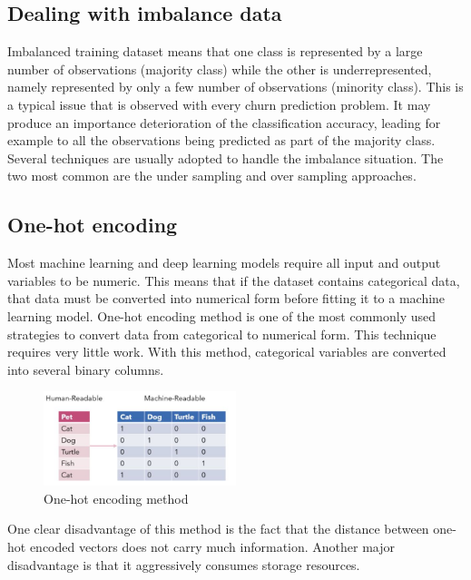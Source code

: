 \documentclass[LaM,binding=0.6cm, english]{sapthesis}
\begin{document}
\subsection{Dealing with imbalance data} \label{imbalance_data}

Imbalanced training dataset means that one class is represented by a large number of observations (majority class) while the other is underrepresented, namely represented by only a few number of observations (minority class). This is a typical issue that is observed with every churn prediction problem. It may produce an importance deterioration of the classification accuracy, leading for example to all the observations being predicted as part of the majority class. Several techniques are usually adopted to handle the imbalance situation. The two most common are the under sampling and over sampling approaches.\cite{Barandela2004}

\subsection{One-hot encoding} \label{one-hot_encoding}

Most machine learning and deep learning models require all input and output variables to be numeric. This means that if the dataset contains categorical data, that data must be converted into numerical form before fitting it to a machine learning model. One-hot encoding method is one of the most commonly used strategies to convert data from categorical to numerical form. This technique requires very little work. With this method, categorical variables are converted into several binary columns.

\begin{figure}[!ht]
    \includegraphics[width=0.5\textwidth]{images/One-hot_encoding.jpg}
    \centering
    \caption{One-hot encoding method}
    \label{fig:one-hot-encoding}
\end{figure}

\par One clear disadvantage of this method is the fact that the distance between one-hot encoded vectors does not carry much information. Another major disadvantage is that it aggressively consumes storage resources.\cite{Hancock2020}
\end{document}
